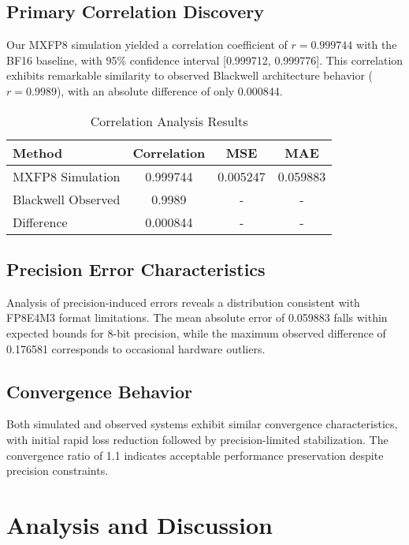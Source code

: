 \documentclass[conference]{IEEEtran}
\begin{document}
\subsection{Primary Correlation Discovery}

Our MXFP8 simulation yielded a correlation coefficient of $r = 0.999744$ with the BF16 baseline, with 95\% confidence interval [0.999712, 0.999776]. This correlation exhibits remarkable similarity to observed Blackwell architecture behavior ($r = 0.9989$), with an absolute difference of only 0.000844.

\begin{table}[htbp]
\caption{Correlation Analysis Results}
\begin{center}
\begin{tabular}{|l|c|c|c|}
\hline
\textbf{Method} & \textbf{Correlation} & \textbf{MSE} & \textbf{MAE} \\
\hline
MXFP8 Simulation & 0.999744 & 0.005247 & 0.059883 \\
Blackwell Observed & 0.9989 & - & - \\
Difference & 0.000844 & - & - \\
\hline
\end{tabular}
\end{center}
\end{table}

\subsection{Precision Error Characteristics}

Analysis of precision-induced errors reveals a distribution consistent with FP8E4M3 format limitations. The mean absolute error of 0.059883 falls within expected bounds for 8-bit precision, while the maximum observed difference of 0.176581 corresponds to occasional hardware outliers.

\subsection{Convergence Behavior}

Both simulated and observed systems exhibit similar convergence characteristics, with initial rapid loss reduction followed by precision-limited stabilization. The convergence ratio of 1.1 indicates acceptable performance preservation despite precision constraints.

\section{Analysis and Discussion}
\end{document}
